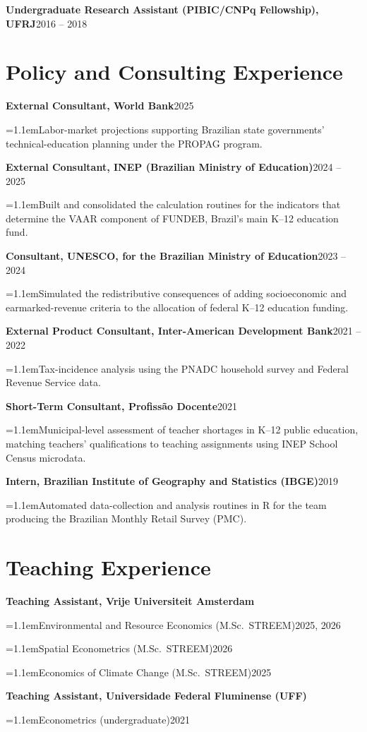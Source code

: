 \documentclass[11pt]{article}
\newcommand{\entry}[2]{\noindent\textbf{#1}\hfill #2\par}
\newcommand{\subline}[1]{{\leftskip=1.1em\noindent #1\par}}
\begin{document}
\entry{Undergraduate Research Assistant (PIBIC/CNPq Fellowship), UFRJ}{2016 -- 2018}

\section*{Policy and Consulting Experience}

\entry{External Consultant, World Bank}{2025}
\subline{Labor-market projections supporting Brazilian state governments' technical-education
planning under the PROPAG program.}

\entry{External Consultant, INEP (Brazilian Ministry of Education)}{2024 -- 2025}
\subline{Built and consolidated the calculation routines for the indicators that determine the VAAR
component of FUNDEB, Brazil's main K--12 education fund.}

\entry{Consultant, UNESCO, for the Brazilian Ministry of Education}{2023 -- 2024}
\subline{Simulated the redistributive consequences of adding socioeconomic and earmarked-revenue
criteria to the allocation of federal K--12 education funding.}

\entry{External Product Consultant, Inter-American Development Bank}{2021 -- 2022}
\subline{Tax-incidence analysis using the PNADC household survey and Federal Revenue Service data.}

\entry{Short-Term Consultant, Profissão Docente}{2021}
\subline{Municipal-level assessment of teacher shortages in K--12 public education, matching
teachers' qualifications to teaching assignments using INEP School Census microdata.}

\entry{Intern, Brazilian Institute of Geography and Statistics (IBGE)}{2019}
\subline{Automated data-collection and analysis routines in R for the team producing the Brazilian
Monthly Retail Survey (PMC).}

\section*{Teaching Experience}

\entry{Teaching Assistant, Vrije Universiteit Amsterdam}{}
\subline{Environmental and Resource Economics (M.Sc.\ STREEM)\hfill 2025, 2026}
\subline{Spatial Econometrics (M.Sc.\ STREEM)\hfill 2026}
\subline{Economics of Climate Change (M.Sc.\ STREEM)\hfill 2025}

\entry{Teaching Assistant, Universidade Federal Fluminense (UFF)}{}
\subline{Econometrics (undergraduate)\hfill 2021}
\end{document}
